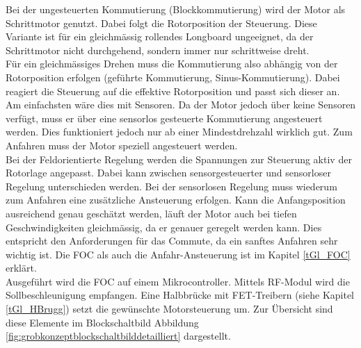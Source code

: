 Bei der ungesteuerten Kommutierung (Blockkommutierung) wird der Motor als Schrittmotor genutzt. Dabei folgt die Rotorposition der Steuerung. Diese Variante ist für ein gleichmässig rollendes Longboard ungeeignet, da der Schrittmotor nicht durchgehend, sondern immer nur schrittweise dreht. \\
Für ein gleichmässiges Drehen muss die Kommutierung also abhängig von der Rotorposition erfolgen (geführte Kommutierung, Sinus-Kommutierung). Dabei reagiert die Steuerung auf die effektive Rotorposition und passt sich dieser an. Am einfachsten wäre dies mit Sensoren. Da der Motor jedoch über keine Sensoren verfügt, muss er über eine sensorlos gesteuerte Kommutierung angesteuert werden. Dies funktioniert jedoch nur ab einer Mindestdrehzahl wirklich gut. Zum Anfahren muss der Motor speziell angesteuert werden. \\
Bei der Feldorientierte Regelung  werden die Spannungen zur Steuerung aktiv der Rotorlage angepasst. Dabei kann zwischen sensorgesteuerter und sensorloser Regelung unterschieden werden. Bei der sensorlosen Regelung muss wiederum zum Anfahren eine zusätzliche Ansteuerung erfolgen. Kann die Anfangsposition ausreichend genau geschätzt werden, läuft der Motor auch bei tiefen Geschwindigkeiten gleichmässig, da er genauer geregelt werden kann. Dies entspricht den Anforderungen für das Commute, da ein sanftes Anfahren sehr wichtig ist. Die FOC als auch die Anfahr-Ansteuerung ist im Kapitel \ref{tGl_FOC} erklärt.\\
Ausgeführt wird die FOC auf einem Mikrocontroller. Mittels RF-Modul wird die Sollbeschleunigung empfangen. Eine Halbbrücke mit FET-Treibern (siehe Kapitel \ref{tGl_HBrugg}) setzt  die gewünschte Motorsteuerung um. Zur Übersicht sind diese Elemente im Blockschaltbild Abbildung \ref{fig:grobkonzeptblockschaltbilddetailliert} dargestellt. 

